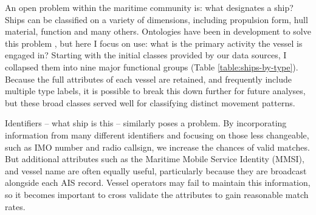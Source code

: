 




An open problem within the maritime community is: what designates a ship? Ships can be classified on a variety of dimensions, including propulsion form, hull material, function and many others. Ontologies have been in development to solve this problem \cite{Vries2009}, but here I focus on use: what is the primary activity the vessel is engaged in? Starting with the initial classes provided by our data sources, I collapsed them into nine major functional groups (Table \ref{table:ships-by-type}). Because the full attributes of each vessel are retained, and frequently include multiple type labels, it is possible to break this down further for future analyses, but these broad classes served well for classifying distinct movement patterns.

Identifiers -- what ship is this -- similarly poses a problem. By incorporating information from many different identifiers and focusing on those less changeable, such as IMO number and radio callsign, we increase the chances of valid matches. But additional attributes such as the Maritime Mobile Service Identity (MMSI), and vessel name are often equally useful, particularly because they are broadcast alongside each AIS record. Vessel operators may fail to maintain this information, so it becomes important to cross validate the attributes to gain reasonable match rates.

